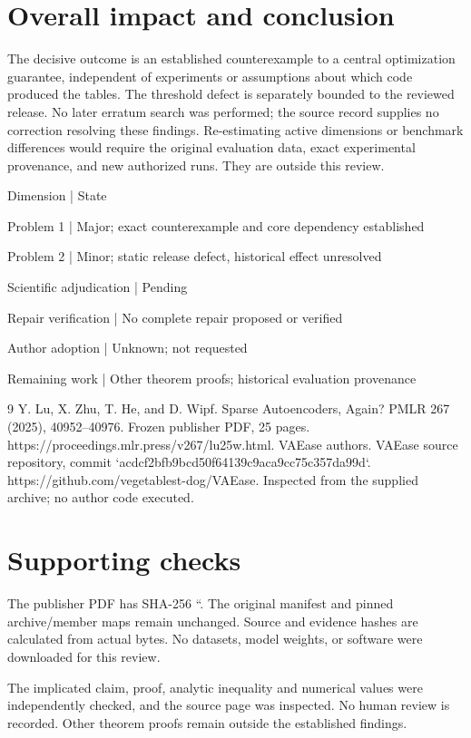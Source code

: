 \documentclass[10pt]{article}
\begin{document}
\section*{Overall impact and conclusion}
The decisive outcome is an established counterexample to a central optimization guarantee, independent of experiments or assumptions about which code produced the tables. The threshold defect is separately bounded to the reviewed release. No later erratum search was performed; the source record supplies no correction resolving these findings. Re-estimating active dimensions or benchmark differences would require the original evaluation data, exact experimental provenance, and new authorized runs. They are outside this review.\par
Dimension | State\par
Problem 1 | Major; exact counterexample and core dependency established\par
Problem 2 | Minor; static release defect, historical effect unresolved\par
Scientific adjudication | Pending\par
Repair verification | No complete repair proposed or verified\par
Author adoption | Unknown; not requested\par
Remaining work | Other theorem proofs; historical evaluation provenance\par
9 Y. Lu, X. Zhu, T. He, and D. Wipf. Sparse Autoencoders, Again? PMLR 267 (2025), 40952–40976. Frozen publisher PDF, 25 pages. https://proceedings.mlr.press/v267/lu25w.html. VAEase authors. VAEase source repository, commit `acdcf2bfb9bcd50f64139c9aca9cc75c357da99d`. https://github.com/vegetablest-dog/VAEase. Inspected from the supplied archive; no author code executed.\par
\section*{Supporting checks}
The publisher PDF has SHA-256 ``. The original manifest and pinned archive/member maps remain unchanged. Source and evidence hashes are calculated from actual bytes. No datasets, model weights, or software were downloaded for this review.\par
The implicated claim, proof, analytic inequality and numerical values were independently checked, and the source page was inspected. No human review is recorded. Other theorem proofs remain outside the established findings.\par
\end{document}

